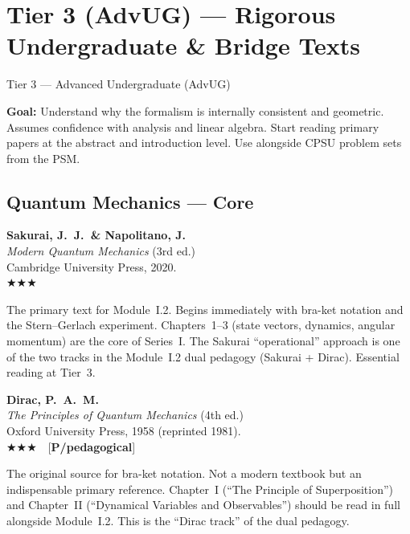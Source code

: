 \documentclass[11pt,a4paper]{article}
\newcommand{\essential}{$\bigstar\bigstar\bigstar$}
\newenvironment{bibentry}[1]{%
  \begin{tcolorbox}[entrybox=#1, top=4pt, bottom=4pt]%
}{%
  \end{tcolorbox}\smallskip%
}
\begin{document}
\newpage
\section{Tier 3 (AdvUG) --- Rigorous Undergraduate \& Bridge Texts}
\label{sec:t3}

\begin{tcolorbox}[tierheader=t3purple]
Tier 3 --- Advanced Undergraduate (AdvUG)
\end{tcolorbox}

\medskip
\begin{tcolorbox}[keybox]
\textbf{Goal:} Understand why the formalism is internally consistent and geometric.
Assumes confidence with analysis and linear algebra. Start reading primary papers
at the abstract and introduction level. Use alongside CPSU problem sets from the PSM.
\end{tcolorbox}

\subsection{Quantum Mechanics --- Core}

\begin{bibentry}{t3light}
\textbf{Sakurai, J.~J.\ \& Napolitano, J.}\\
\textit{Modern Quantum Mechanics} (3rd ed.)\\
Cambridge University Press, 2020.\\[4pt]
\essential\\[4pt]
\begin{tcolorbox}[annotbox]
The primary text for Module~I.2. Begins immediately with bra-ket notation and the
Stern--Gerlach experiment. Chapters~1--3 (state vectors, dynamics, angular momentum)
are the core of Series~I. The Sakurai ``operational'' approach is one of the two tracks
in the Module~I.2 dual pedagogy (Sakurai + Dirac). Essential reading at Tier~3.
\end{tcolorbox}
\end{bibentry}

\begin{bibentry}{t3light}
\textbf{Dirac, P.~A.~M.}\\
\textit{The Principles of Quantum Mechanics} (4th ed.)\\
Oxford University Press, 1958 (reprinted 1981).\\[4pt]
\essential\ \ [\textbf{P/pedagogical}]\\[4pt]
\begin{tcolorbox}[annotbox]
The original source for bra-ket notation. Not a modern textbook but an indispensable
primary reference. Chapter~I (``The Principle of Superposition'') and Chapter~II
(``Dynamical Variables and Observables'') should be read in full alongside
Module~I.2. This is the ``Dirac track'' of the dual pedagogy.
\end{tcolorbox}
\end{bibentry}
\end{document}
